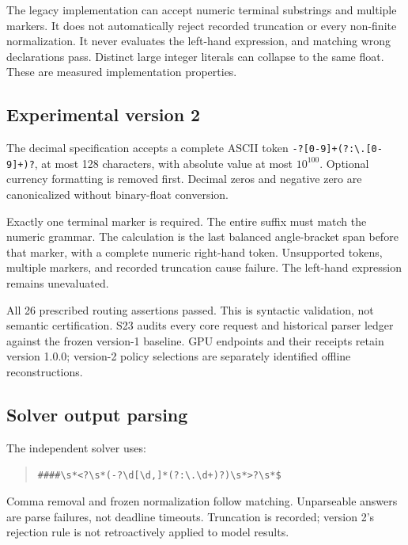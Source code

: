 \documentclass[journal,onecolumn]{IEEEtran}
\begin{document}
The legacy implementation can accept numeric terminal substrings and multiple markers. It does not automatically reject recorded truncation or every non-finite normalization. It never evaluates the left-hand expression, and matching wrong declarations pass. Distinct large integer literals can collapse to the same float. These are measured implementation properties.

\subsection{Experimental version 2}
The decimal specification accepts a complete ASCII token \verb|-?[0-9]+(?:\.[0-9]+)?|, at most 128 characters, with absolute value at most $10^{100}$. Optional currency formatting is removed first. Decimal zeros and negative zero are canonicalized without binary-float conversion.

Exactly one terminal marker is required. The entire suffix must match the numeric grammar. The calculation is the last balanced angle-bracket span before that marker, with a complete numeric right-hand token. Unsupported tokens, multiple markers, and recorded truncation cause failure. The left-hand expression remains unevaluated.


All 26 prescribed routing assertions passed. This is syntactic validation, not semantic certification. S23 audits every core request and historical parser ledger against the frozen version-1 baseline. GPU endpoints and their receipts retain version 1.0.0; version-2 policy selections are separately identified offline reconstructions.

\begin{samepage}
\subsection{Solver output parsing}
The independent solver uses:
\begin{quote}\ttfamily\footnotesize
\verb|####\s*<?\s*(-?\d[\d,]*(?:\.\d+)?)\s*>?\s*$|
\end{quote}
Comma removal and frozen normalization follow matching. Unparseable answers are parse failures, not deadline timeouts. Truncation is recorded; version 2's rejection rule is not retroactively applied to model results.
\end{samepage}
\end{document}
